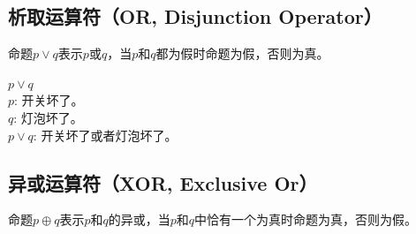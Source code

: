 \vspace{0.5cm}

\subsection{析取运算符（OR, Disjunction Operator）}

命题$ p \vee q $表示$ p $或$ q $，当$ p $和$ q $都为假时命题为假，否则为真。

\begin{table}[H]
	\centering
	\caption{OR真值表}
\end{table}

\begin{tcolorbox}
	$ p \vee q $\\
	$ p $: 开关坏了。\\
	$ q $: 灯泡坏了。\\
	$ p \vee q $: 开关坏了或者灯泡坏了。
\end{tcolorbox}

\vspace{0.5cm}

\subsection{异或运算符（XOR, Exclusive Or）}

命题$ p \oplus q $表示$ p $和$ q $的异或，当$ p $和$ q $中恰有一个为真时命题为真，否则为假。

\begin{table}[H]
	\centering
	\caption{XOR真值表}
\end{table}

